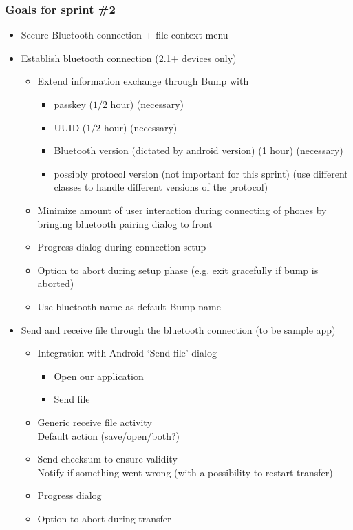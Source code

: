 \documentclass[a4paper,11pt]{article}
\begin{document}
\subsubsection{Goals for sprint \#2}
\begin{itemize}
\item Secure Bluetooth connection + file context menu
\item Establish bluetooth connection (2.1+ devices only)
\begin{itemize}
\item Extend information exchange through Bump with
\begin{itemize}
\item passkey ($1/2$ hour) (necessary)
\item UUID ($1/2$ hour) (necessary)
\item Bluetooth version (dictated by android version) (1 hour) (necessary)
\item possibly protocol version (not important for this sprint) (use different classes to handle different versions of the protocol)
\end{itemize}
\item Minimize amount of user interaction during connecting of phones by bringing bluetooth pairing dialog to front
\item Progress dialog during connection setup
\item Option to abort during setup phase (e.g. exit gracefully if bump is aborted)
\item Use bluetooth name as default Bump name
\end{itemize}
\item Send and receive file through the bluetooth connection (to be sample app)
\begin{itemize}
\item Integration with Android ‘Send file’ dialog
\begin{itemize}
\item Open our application
\item Send file
\end{itemize}
\item Generic receive file activity\\Default action (save/open/both?)
\item Send checksum to ensure validity\\
Notify if something went wrong (with a possibility to restart transfer)
\item Progress dialog
\item Option to abort during transfer

\end{itemize}
\end{itemize}
\end{document}

